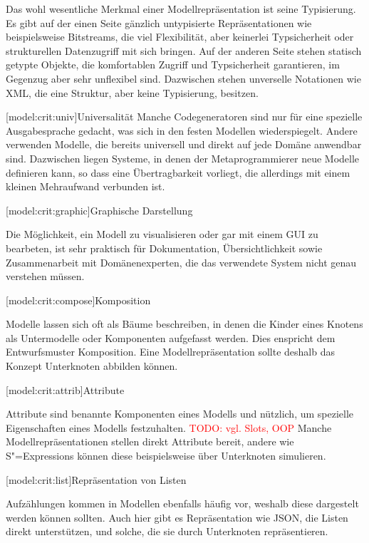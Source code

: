 \documentclass[11pt, a4paper, bibgerm]{book}
\newcommand{\todo}[1]{
  \textcolor{red}{TODO: #1}
}
\newcommand\lsubsection{}
\newcommand{\sexps}{S"=Expressions}
\begin{document}
Das wohl wesentliche Merkmal einer Modellrepräsentation ist seine
Typisierung. Es gibt auf der einen Seite gänzlich untypisierte
Repräsentationen wie beispielsweise Bitstreams, die viel Flexibilität,
aber keinerlei Typsicherheit oder strukturellen Datenzugriff mit sich
bringen. Auf der anderen Seite stehen statisch getypte Objekte, die
komfortablen Zugriff und Typsicherheit garantieren, im Gegenzug aber
sehr unflexibel sind. Dazwischen stehen unverselle Notationen wie XML,
die eine Struktur, aber keine Typisierung, besitzen.

\lsubsection[model:crit:univ]{Universalität} Manche
Codegeneratoren sind nur für eine spezielle Ausgabesprache gedacht, was
sich in den festen Modellen wiederspiegelt. Andere verwenden Modelle,
die bereits universell und direkt auf jede Domäne anwendbar
sind. Dazwischen liegen Systeme, in denen der Metaprogrammierer neue
Modelle definieren kann, so dass eine Übertragbarkeit vorliegt, die
allerdings mit einem kleinen Mehraufwand verbunden ist.

\lsubsection[model:crit:graphic]{Graphische Darstellung}

Die Möglichkeit, ein Modell zu visualisieren oder gar mit einem GUI zu
bearbeten, ist sehr praktisch für Dokumentation, Übersichtlichkeit sowie
Zusammenarbeit mit Domänenexperten, die das verwendete System nicht
genau verstehen müssen.

\lsubsection[model:crit:compose]{Komposition}

Modelle lassen sich oft als Bäume beschreiben, in denen die Kinder eines
Knotens als Untermodelle oder Komponenten aufgefasst werden. Dies
enspricht dem Entwurfsmuster Komposition\cite{TODO}. Eine
Modellrepräsentation sollte deshalb das Konzept Unterknoten abbilden
können.

\lsubsection[model:crit:attrib]{Attribute}

Attribute sind benannte Komponenten eines Modells und nützlich, um
spezielle Eigenschaften eines Modells festzuhalten. \todo{vgl. Slots,
  OOP} Manche Modellrepräsentationen stellen direkt Attribute bereit,
andere wie \sexps{} können diese beispielsweise über Unterknoten
simulieren.

\lsubsection[model:crit:list]{Repräsentation von Listen}

Aufzählungen kommen in Modellen ebenfalls häufig vor, weshalb diese
dargestelt werden können sollten. Auch hier gibt es Repräsentation wie
JSON, die Listen direkt unterstützen, und solche, die sie durch
Unterknoten repräsentieren.
\end{document}
